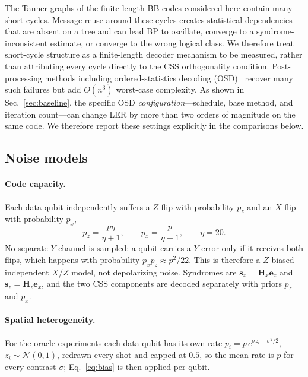 \documentclass[a4paper,twocolumn,11pt,nopdfoutputerror]{quantumarticle}
\newcommand{\Hmat}{\mathbf{H}}
\begin{document}
The Tanner graphs of the finite-length BB codes considered here contain
many short cycles. Message reuse around these cycles creates statistical
dependencies that are absent on a tree and can lead BP to oscillate,
converge to a syndrome-inconsistent estimate, or converge to the wrong
logical class. We therefore treat short-cycle structure as a finite-length
decoder mechanism to be measured, rather than attributing every cycle
directly to the CSS orthogonality condition. Post-processing methods
including ordered-statistics decoding (OSD)~\cite{Fossorier1995OSD}
recover many such failures but add $O(n^3)$ worst-case complexity.
As shown in Sec.~\ref{sec:baseline}, the specific OSD
\emph{configuration}---schedule, base method, and iteration count---can
change LER by more than two orders of magnitude on the same code. We
therefore report these settings explicitly in the comparisons below.

\subsection{Noise models}\label{sec:noise}

\paragraph{Code capacity.} Each data qubit independently suffers a $Z$
flip with probability $p_z$ and an $X$ flip with probability $p_x$,
\begin{equation}
p_z = \frac{p\eta}{\eta+1}, \qquad p_x = \frac{p}{\eta+1},
\qquad \eta = 20 .
\label{eq:bias}
\end{equation}
No separate $Y$ channel is sampled: a qubit carries a $Y$ error only if it
receives both flips, which happens with probability
$p_xp_z\approx p^2/22$. This is therefore a $Z$-biased independent
$X$/$Z$ model, not depolarizing noise. Syndromes are
$\mathbf{s}_x=\Hmat_x\mathbf{e}_z$ and $\mathbf{s}_z=\Hmat_z\mathbf{e}_x$,
and the two CSS components are decoded separately with priors $p_z$ and
$p_x$.

\paragraph{Spatial heterogeneity.} For the oracle experiments each data
qubit has its own rate $p_i=p\,e^{\sigma z_i-\sigma^2/2}$,
$z_i\sim\mathcal N(0,1)$, redrawn every shot and capped at $0.5$, so the
mean rate is $p$ for every contrast $\sigma$; Eq.~\eqref{eq:bias} is then
applied per qubit.
\end{document}
